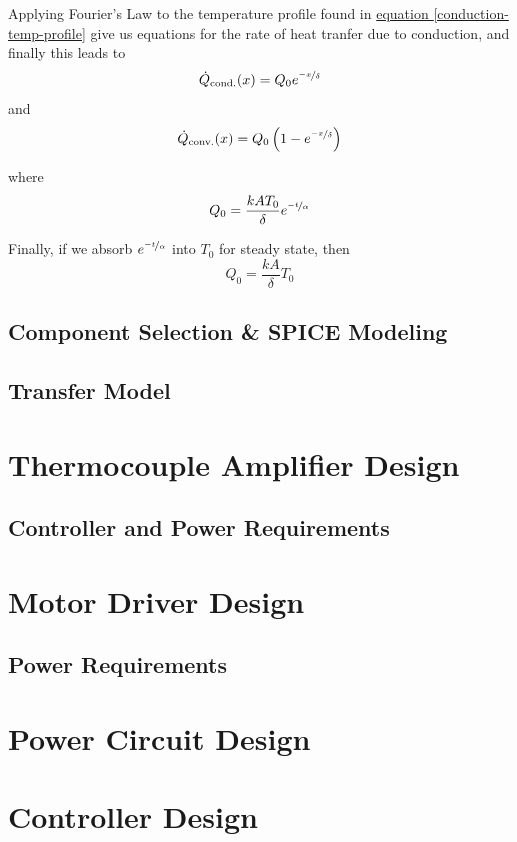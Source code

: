 \documentclass[10pt, twocolumn]{article}
\begin{document}
Applying Fourier's Law to the temperature profile found in
\hyperref[conduction-temp-profile]{equation \ref{conduction-temp-profile}}
give us equations for the rate of heat tranfer due to conduction,
and finally this leads to
\begin{equation*}
\dot{Q}_{\textrm{cond.}}(x)=Q_{0}e^{\nicefrac{-x}{\delta}}
\end{equation*}
and
\begin{equation*}
\dot{Q}_{\textrm{conv.}}(x)=Q_{0}\left(1-e^{\nicefrac{-x}{\delta}}\right)
\end{equation*}

where
\begin{equation*}
Q_{0}=\frac{kAT_{0}}{\delta}e^{\nicefrac{-t}{\alpha}}
\end{equation*}

Finally, if we absorb $e^{\nicefrac{-t}{\alpha}}$ into $T_{0}$ for steady state, then
\begin{equation}
Q_{0}=\frac{kA}{\delta}T_{0}
\end{equation}





\subsection{Component Selection \& SPICE Modeling}

\subsection{Transfer Model}

\section{Thermocouple Amplifier Design}

\subsection{Controller and Power Requirements}

\section{Motor Driver Design}

\subsection{Power Requirements}

\section{Power Circuit Design}

\section{Controller Design}
\end{document}
